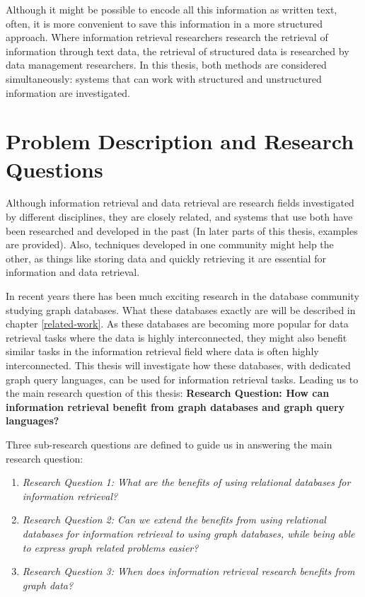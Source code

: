 Although it might be possible to encode all this information as written text, often, it is more convenient to save this information in a more structured approach. Where information retrieval researchers research the retrieval of information through text data, the retrieval of structured data is researched by data management researchers. In this thesis, both methods are considered simultaneously: systems that can work with structured and unstructured information are investigated.

\section{Problem Description and Research Questions}
Although information retrieval and data retrieval are research fields investigated by different disciplines, they are closely related, and systems that use both have been researched and developed in the past (In later parts of this thesis, examples are provided). Also, techniques developed in one community might help the other, as things like storing data and quickly retrieving it are essential for information and data retrieval. 

In recent years there has been much exciting research in the database community studying graph databases. What these databases exactly are will be described in chapter \ref{related-work}. As these databases are becoming more popular for data retrieval tasks where the data is highly interconnected, they might also benefit similar tasks in the information retrieval field where data is often highly interconnected. This thesis will investigate how these databases, with dedicated graph query languages, can be used for information retrieval tasks. Leading us to the main research question of this thesis: \textbf{Research Question: How can information retrieval benefit from graph databases and graph query languages?}

Three sub-research questions are defined to guide us in answering the main research question:

\begin{enumerate}
	\item \emph{Research Question 1: What are the benefits of using relational databases for information retrieval?} 
	\item \emph{Research Question 2: Can we extend the benefits from using relational databases for information retrieval to using graph databases, while being able to express graph related problems easier?} 
	\item \emph{Research Question 3: When does information retrieval research benefits from graph data?} 
\end{enumerate}

